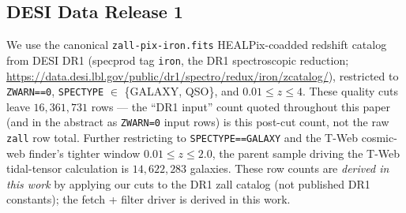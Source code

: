 \documentclass[twocolumn,linenumbers]{aastex702}
\newcommand{\paperIVarxiv}{publicly archived on Zenodo under
\href{https://doi.org/10.5281/zenodo.21461899}{DOI 10.5281/zenodo.21461899};
not peer reviewed}
\begin{document}
\begin{table}[!htbp]
\caption{Paper~IV inputs consumed by this analysis, summarized for
self-contained readability. Values are reproduced from
Paper~IV~\cite{golden_chirality_2026} (companion catalog paper, \paperIVarxiv;
full classifier architecture, training, parity-equivariance validation, and monopole
origin summarized for self-contained assessment in
Appendix~\ref{app:paper4_methods});
labels are served as the \texttt{class\_eq} column of the public catalog
\href{https://huggingface.co/datasets/bamfai/galaxy-chirality-catalog}{bamfai/galaxy-chirality-catalog}.
The per-galaxy \texttt{class\_eq} labels are the only classifier input the
focal contrast uses; the monopole amplitude enters
only the $\sigma_{\rm pred}$ diagnostics.}
\label{tab:p4_inputs}
\centering
\footnotesize
{}
\end{table}

\subsection{DESI Data Release 1}

We use the canonical \texttt{zall-pix-iron.fits} HEALPix-coadded
redshift catalog from DESI DR1 (specprod tag \texttt{iron}, the DR1
spectroscopic reduction;
\url{https://data.desi.lbl.gov/public/dr1/spectro/redux/iron/zcatalog/}),
restricted to \texttt{ZWARN==0},
\texttt{SPECTYPE} $\in$ \{GALAXY, QSO\}, and $0.01 \le z \le 4$.
These quality cuts leave $16{,}361{,}731$ rows — the ``DR1 input''
count quoted throughout this paper (and in the abstract as
\texttt{ZWARN=0} input rows) is this post-cut count, not the raw
\texttt{zall} row total. Further restricting to
\texttt{SPECTYPE==GALAXY} and the T-Web cosmic-web finder's tighter
window $0.01 \le z \le 2.0$, the parent sample driving the T-Web
tidal-tensor calculation is $14{,}622{,}283$ galaxies. These row counts are
\emph{derived in this work} by applying our cuts to the DR1 zall
catalog (not published DR1 constants); the fetch + filter driver
is derived in this work.
\end{document}
